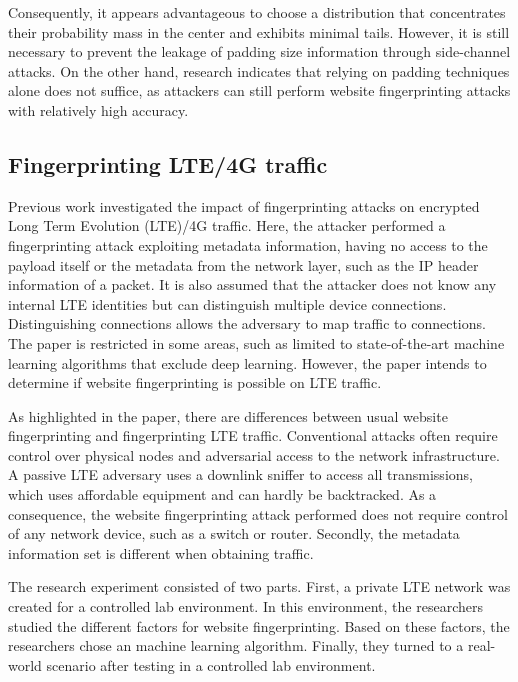 Consequently, it appears advantageous to choose a distribution that concentrates their probability mass in the center and exhibits minimal tails. However, it is still necessary to prevent the leakage of padding size information through side-channel attacks. On the other hand, research \cite{DBLP:conf/sp/DyerCRS12} indicates that relying on padding techniques alone does not suffice, as attackers can still perform website fingerprinting attacks with relatively high accuracy. 

\subsection{Fingerprinting LTE/4G traffic\label{sec:LTE-intro}}

Previous work \cite{kohls2019lost} investigated the impact of fingerprinting attacks on encrypted Long Term Evolution (LTE)/4G traffic. Here, the attacker performed a fingerprinting attack exploiting metadata information, having no access to the payload itself or the metadata from the network layer, such as the IP header information of a packet. It is also assumed that the attacker does not know any internal LTE identities but can distinguish multiple device connections. Distinguishing connections allows the adversary to map traffic to connections. The paper is restricted in some areas, such as limited to state-of-the-art machine learning algorithms that exclude deep learning. However, the paper intends to determine if website fingerprinting is possible on LTE traffic.

As highlighted in the paper, there are differences between usual website fingerprinting and fingerprinting LTE traffic. Conventional attacks often require control over physical nodes and adversarial access to the network infrastructure. A passive LTE adversary uses a downlink sniffer to access all transmissions, which uses affordable equipment and can hardly be backtracked. As a consequence, the website fingerprinting attack performed does not require control of any network device, such as a switch or router. Secondly, the metadata information set is different when obtaining traffic.

The research experiment consisted of two parts. First, a private LTE network was created for a controlled lab environment. In this environment, the researchers studied the different factors for website fingerprinting. Based on these factors, the researchers chose an machine learning algorithm. Finally, they turned to a real-world scenario after testing in a controlled lab environment.

